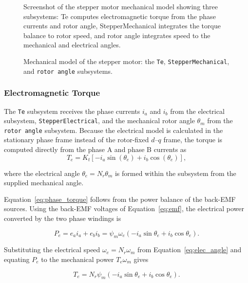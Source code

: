 \begin{figure}[htbp]
	\centering
		{Screenshot of the stepper motor mechanical model showing three subsystems: Te computes electromagnetic torque from the phase currents and rotor angle, StepperMechanical integrates the torque balance to rotor speed, and rotor angle integrates speed to the mechanical and electrical angles.}
	\caption[Mechanical model of the stepper motor]{Mechanical model of the stepper motor: the \texttt{Te}, \texttt{StepperMechanical}, and \texttt{rotor angle} subsystems.}
	\label{fig:mech_model_overview}
\end{figure}
\subsubsection{Electromagnetic Torque}

The \texttt{Te} subsystem receives the phase currents $i_a$ and $i_b$ from the electrical subsystem, \texttt{StepperElectrical}, and the mechanical rotor angle $\theta_m$ from the \texttt{rotor angle} subsystem. Because the electrical model is calculated in the stationary phase frame instead of the rotor-fixed $d$--$q$ frame, the torque is computed directly from the phase A and phase B currents as
\begin{equation}
	T_e = K_t \left[ -i_a \sin\left( \theta_e\right)
	+ i_b \cos\left( \theta_e\right) \right],
	\label{eq:phase_torque}
\end{equation}

where the electrical angle $\theta_e = N_r \theta_m$ is formed within the subsystem from the supplied mechanical angle.

Equation~\eqref{eq:phase_torque} follows from the power balance of the
back-EMF sources. Using the back-EMF voltages of Equation~\eqref{eq:emf},
the electrical power converted by the two phase windings is

\begin{equation}
	P_e = e_a i_a + e_b i_b
	= \psi_m \omega_e \left( -i_a \sin\theta_e + i_b \cos\theta_e \right).
	\label{eq:phase_power}
\end{equation}

Substituting the electrical speed $\omega_e = N_r \omega_m$ from
Equation~\eqref{eq:elec_angle} and equating $P_e$ to the mechanical
power $T_e \omega_m$ gives

\begin{equation}
	T_e = N_r \psi_m \left( -i_a \sin\theta_e + i_b \cos\theta_e \right).
	\label{eq:torque_from_power}
\end{equation}

